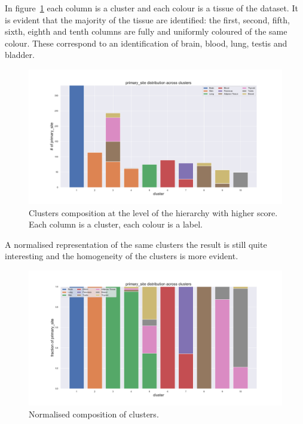 In figure~\ref{fig:topic/gtex/oversigma_10tissue/clustercomposition_l3_primary_site} each column is a cluster and each colour is a tissue of the dataset. It is evident that the majority of the tissue are identified: the first, second, fifth, sixth, eighth and tenth columns are fully and uniformly coloured of the same colour. These correspond to an identification of brain, blood, lung, testis and bladder.
\begin{figure}[htb!]
    \centering
    \includegraphics[width=0.9\linewidth]{pictures/topic/gtex/oversigma_10tissue/clustercomposition_l3_primary_site.pdf}
    \caption{Clusters composition at the level of the hierarchy with higher score. Each column is a cluster, each colour is a label.}
    \label{fig:topic/gtex/oversigma_10tissue/clustercomposition_l3_primary_site}
\end{figure}
A normalised representation of the same clusters the result is still quite interesting and the homogeneity of the clusters is more evident.
\begin{figure}[htb!]
    \centering
    \includegraphics[width=0.9\linewidth]{pictures/topic/gtex/oversigma_10tissue/fraction_clustercomposition_l3_primary_site.pdf}
    \caption{Normalised composition of clusters.}
    \label{fig:topic/gtex/oversigma_10tissue/fraction_clustercomposition_l3_primary_site}
\end{figure}
